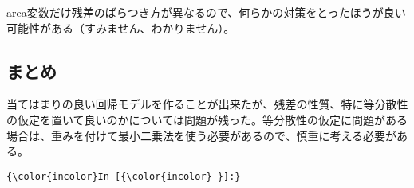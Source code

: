 \documentclass[a4paper,dvipdfmx]{jsarticle}
\begin{document}
area変数だけ残差のばらつき方が異なるので、何らかの対策をとったほうが良い可能性がある（すみません、わかりません）。

    \subsection{まとめ}\label{ux307eux3068ux3081}

    当てはまりの良い回帰モデルを作ることが出来たが、残差の性質、特に等分散性の仮定を置いて良いのかについては問題が残った。等分散性の仮定に問題がある場合は、重みを付けて最小二乗法を使う必要があるので、慎重に考える必要がある。

    \begin{Verbatim}[commandchars=\\\{\}]
{\color{incolor}In [{\color{incolor} }]:} 
\end{Verbatim}


    
    
    
    
\end{document}
